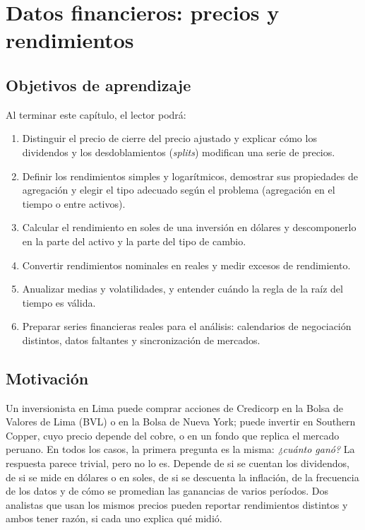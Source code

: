 \chapter{Datos financieros: precios y rendimientos}\label{cap:rendimientos}

\section*{Objetivos de aprendizaje}
Al terminar este capítulo, el lector podrá:
\begin{enumerate}[label=\arabic*.,leftmargin=*]
  \item Distinguir el precio de cierre del precio ajustado y explicar cómo los dividendos y los
        desdoblamientos (\emph{splits}) modifican una serie de precios.
  \item Definir los rendimientos simples y logarítmicos, demostrar sus propiedades de agregación y
        elegir el tipo adecuado según el problema (agregación en el tiempo o entre activos).
  \item Calcular el rendimiento en soles de una inversión en dólares y descomponerlo en la parte del
        activo y la parte del tipo de cambio.
  \item Convertir rendimientos nominales en reales y medir excesos de rendimiento.
  \item Anualizar medias y volatilidades, y entender cuándo la regla de la raíz del tiempo es válida.
  \item Preparar series financieras reales para el análisis: calendarios de negociación distintos,
        datos faltantes y sincronización de mercados.
\end{enumerate}

\section*{Motivación}
Un inversionista en Lima puede comprar acciones de Credicorp en la Bolsa de Valores de Lima (BVL) o
en la Bolsa de Nueva York; puede invertir en Southern Copper, cuyo precio depende del cobre, o en un
fondo que replica el mercado peruano. En todos los casos, la primera pregunta es la misma: \emph{¿cuánto
ganó?} La respuesta parece trivial, pero no lo es. Depende de si se cuentan los dividendos, de si se mide
en dólares o en soles, de si se descuenta la inflación, de la frecuencia de los datos y de cómo se
promedian las ganancias de varios períodos. Dos analistas que usan los mismos precios pueden reportar
rendimientos distintos y ambos tener razón, si cada uno explica qué midió.

